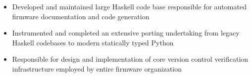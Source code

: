 \documentclass[10pt,a4paper]{altacv}
\newenvironment{tightitemize} %
{\vspace{-\topsep}\begin{itemize}\itemsep1pt \parskip0pt \parsep0pt}
{\end{itemize}\vspace{-\topsep}}
\begin{document}

\begin{fullwidth}
\makecvheader
\end{fullwidth}



\vspace{\topsep} %
\begin{tightitemize}
\item Developed and maintained large Haskell code base responsible for automated firmware 
    documentation and code generation
\item Instrumented and completed an extensive porting undertaking from legacy 
    Haskell codebases to modern statically typed Python
\item Responsible for design and implementation of core version control 
    verification infrastructure employed by entire firmware organization
\end{tightitemize}
\end{document}
